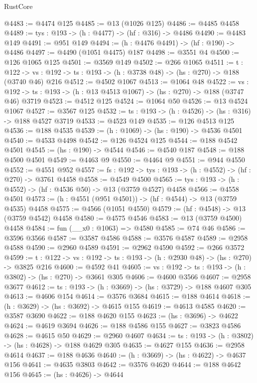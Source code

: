 \begin{lexlean}{RustCore}
\begin{coremodule}
@4483 := @4474 @125
@4485 := @13 (@1026 @125)
@4486 := @4485 @4458
@4489 := {tys : @193} -> (h : @4477) -> (hf : @316) -> @4486
@4490 := @4483 @149
@4491 := @951 @149
@4494 := (h : @4476 @4491) -> (hf : @190) -> @4486
@4497 := @4490 (@1051 @4475) @187
@4498 := @3551 @4
@4500 := @126 @1065 @125
@4501 := @3569 @149
@4502 := @266 @1065
@4511 := {t : @122} ->
  {vs : @192} -> {ts : @193} -> (h : @3738 @48) -> (hs : @270) -> @188 (@3740 @46) @216
@4512 := @4502 @1067
@4513 := @1064 @48
@4522 := {vs : @192} ->
  {ts : @193} -> (h : @13 @4513 @1067) -> (hs : @270) -> @188 (@3747 @46) @3719
@4523 := @4512 @125
@4524 := @1064 @50
@4526 := @13 @4524 @1067
@4527 := @3567 @125
@4532 := {ts : @193} -> (h : @4526) -> (hs : @316) -> @188 @4527 @3719
@4533 := @4523 @149
@4535 := @126 @4513 @125
@4536 := @188 @4535
@4539 := (h : @1069) -> (hs : @190) -> @4536 @4501
@4540 := @4533 @4498
@4542 := @126 @4524 @125
@4544 := @188 @4542 @4501
@4545 := (hs : @190) -> @4544
@4546 := @4540 @187
@4548 := @188 @4500 @4501
@4549 := @4463 @9
@4550 := @4464 @9
@4551 := @944 @4550
@4552 := @4551 @952
@4557 := {fs : @192} -> {tys : @193} -> (h : @4552) -> (hf : @270) -> @3761 @4458
@4558 := @4549 @4500
@4565 := {tys : @193} -> (h : @4552) -> (hf : @4536 @50) -> @13 (@3759 @4527) @4458
@4566 := @4558 @4501
@4573 := (h : @4551 (@951 @4501)) -> (hf : @4544) -> @13 (@3759 @4535) @4458
@4575 := @4566 (@1051 @4550)
@4579 := (hf : @4548) -> @13 (@3759 @4542) @4458
@4580 := @4575 @4546
@4583 := @13 (@3759 @4500) @4458
@4584 := fun (__x0 : @1063) => @4580
@4585 := @74 @46
@4586 := @3596 @3566
@4587 := @3587 @4586
@4588 := @3576 @4587
@4589 := @2958 @4588
@4590 := @2960 @4589
@4591 := @2962 @4590
@4592 := @266 @3572
@4599 := {t : @122} -> {vs : @192} -> {ts : @193} -> (h : @2930 @48) -> (hs : @270) -> @3825 @216
@4600 := @4592 @41
@4605 := {vs : @192} -> {ts : @193} -> (h : @3802) -> (hs : @270) -> @3661 @305
@4606 := @4600 @3566
@4607 := @2958 @3677
@4612 := {ts : @193} -> (h : @3669) -> (hs : @3729) -> @188 @4607 @305
@4613 := @4606 @154
@4614 := @3576 @3684
@4615 := @188 @4614
@4618 := (h : @3629) -> (hs : @3692) -> @4615 @155
@4619 := @4613 @4585
@4620 := @3587 @3690
@4622 := @188 @4620 @155
@4623 := (hs : @3696) -> @4622
@4624 := @4619 @3694
@4626 := @188 @4586 @155
@4627 := @3823 @4586
@4628 := @4615 @50
@4629 := @2960 @4607
@4634 := {ts : @193} -> (h : @3802) -> (hs : @4628) -> @188 @4629 @305
@4635 := @4627 @155
@4636 := @2958 @4614
@4637 := @188 @4636
@4640 := (h : @3669) -> (hs : @4622) -> @4637 @156
@4641 := @4635 @3803
@4642 := @3576 @4620
@4644 := @188 @4642 @156
@4645 := (hs : @4626) -> @4644

\end{coremodule}
\end{lexlean}

